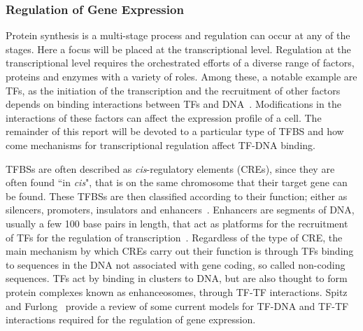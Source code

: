         
        \subsubsection{Regulation of Gene Expression}
        
        Protein synthesis is a multi-stage process and regulation can occur at any of the stages. Here a focus will be placed at the transcriptional level.
        Regulation at the transcriptional level requires the orchestrated efforts of a diverse range of factors, proteins and enzymes with a variety of roles. Among these, a notable example are TFs, as the initiation of the transcription and the recruitment of other factors depends on binding interactions between TFs and DNA~\cite{lemon2000orchestrated}. Modifications in the interactions of these factors can affect the expression profile of a cell. The remainder of this report will be devoted to a particular type of TFBS and how come mechanisms for transcriptional regulation affect TF-DNA binding. 
        
        
        TFBSs are often described as \emph{cis}-regulatory elements (CREs), since they are often found ``in \emph{cis}", that is on the same chromosome that their target gene can be found. These TFBSs are then classified according to their function; either as silencers, promoters, insulators and enhancers~\cite{gaszner2006insulators, gross1988nuclease, li1999locus}. 
        Enhancers are segments of DNA, usually a few 100 base pairs in length, that act as platforms for the recruitment of TFs for the regulation of transcription~\cite{spitz2012transcription}. 
        Regardless of the type of CRE, the main mechanism by which CREs carry out their function is through TFs binding to sequences in the DNA not associated with gene coding, so called non-coding sequences. 
        TFs act by binding in clusters to DNA, but are also thought to form protein complexes known as enhanceosomes, through TF-TF interactions. Spitz and Furlong~\cite{spitz2012transcription} provide a review of some current models for TF-DNA and TF-TF interactions required for the regulation of gene expression.
        
